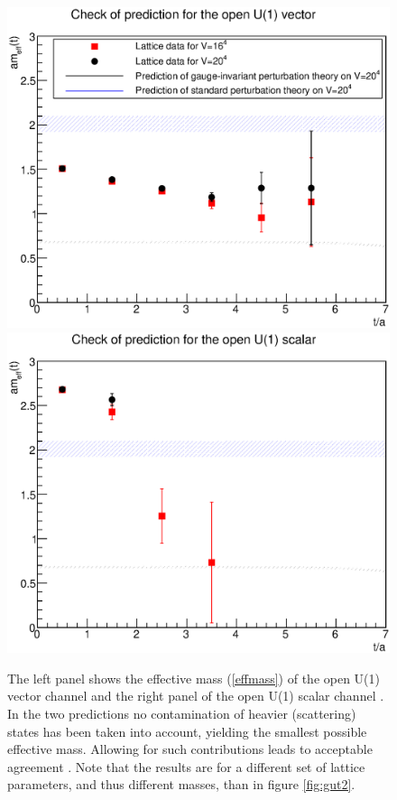 \documentclass[final,12pt,3p,longtitle]{elsarticle}
\newcommand*{\pref}[1]{(\ref{#1})}
\newcommand*{\1}{1\!\!\!\bot}
\begin{document}
\begin{figure}
\includegraphics[width=0.5\linewidth]{su3u1openv}\includegraphics[width=0.5\linewidth]{su3u1opens}
\caption{\label{fig:gutu1}The left panel shows the effective mass \pref{effmass} of the open U(1) vector channel and the right panel of the open U(1) scalar channel \cite{Maas:2017pcw,Maas:unpublishedtoerek}. In the two predictions no contamination of heavier (scattering) states has been taken into account, yielding the smallest possible effective mass. Allowing for such contributions leads to acceptable agreement \cite{Maas:unpublishedtoerek}. Note that the results are for a different set of lattice parameters, and thus different masses, than in figure \ref{fig:gut2}.}
\end{figure}
\end{document}
